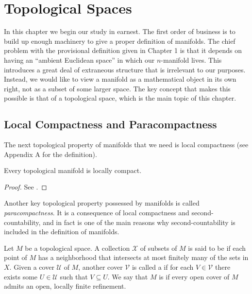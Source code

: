 \documentclass[12pt]{CrispyNotes}
\begin{document}
\section{Topological Spaces}

In this chapter we begin our study in earnest. The first order of business is to build up enough machinery to give a proper definition of manifolds. The chief problem with the provisional definition given in Chapter 1 is that it depends on having an \enquote{ambient Euclidean space} in which our $n$-manifold lives. This introduces a great deal of extraneous structure that is irrelevant to our purposes. Instead, we would like to view a manifold as a mathematical object in its own right, not as a subset of some larger space. The key concept that makes this possible is that of a topological space, which is the main topic of this chapter.

\subsection{Local Compactness and Paracompactness}

The next topological property of manifolds that we need is local compactness (see Appendix A for the definition).
\begin{proposition}\label{prop1}
    Every topological manifold is locally compact.
\end{proposition}
\begin{proof}
    See \cite[47]{leeIntroductionSmoothManifolds2013}.
\end{proof}

Another key topological property possessed by manifolds is called \emph{paracompactness}. It is a consequence of local compactness and second-countability, and in fact is one of the main reasons why second-countability is included in the definition of manifolds.

Let $M$ be a topological space. A collection $\mathcal{X}$ of subsets of $M$ is said to be  if each point of $M$ has a neighborhood that intersects at most finitely many of the sets in $X$. Given a cover $\mathcal{U}$ of $M$, another cover $\mathcal{V}$ is called a  if for each $V \in \mathcal{V}$ there exists some $U \in \mathcal{U}$ such that $V \subseteq U$. We say that $M$ is  if every open cover of $M$ admits an open, locally finite refinement.
\end{document}
